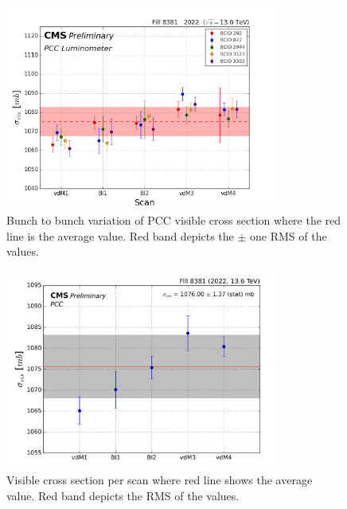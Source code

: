 
\begin{figure}[!htp]
\centering
\includegraphics[width=0.8\textwidth]{ashish_thesis/2022_sigma_vis_btob_variation.png}
\caption[$\sigma_{vis}$ Bunch Variation]{%
  Bunch to bunch variation of PCC visible cross section where the red line is the average value. Red band depicts the $\pm$ one RMS of the values.
}
\label{fig:period_bound_99}
\end{figure}

\begin{figure}[!htp]
\centering
\includegraphics[width=0.8\textwidth]{ashish_thesis/2022_PCC_sigmavis_per_scan_new.png}
\caption[2022 PCC Visible Cross Section]{%
  Visible cross section per scan where red line shows the average value. Red band depicts the RMS of the values.
}
\label{fig:period_bound_105}
\end{figure}

